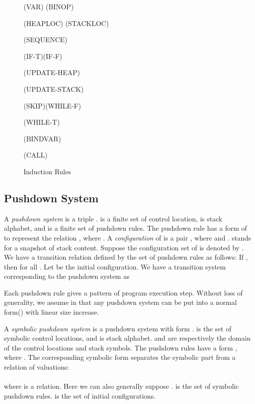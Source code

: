 \documentclass{llncs}
\begin{document}
\begin{figure*}[t]
\begin{minipage}[t]{6.8in}\scriptsize
 \quad(VAR)\qquad
 \quad(BINOP)

\quad (HEAPLOC)\qquad
\quad (STACKLOC)

\quad(SEQUENCE)

\quad(IF-T)\qquad \quad(IF-F)

\quad(UPDATE-HEAP)

\quad(UPDATE-STACK)

\quad
(SKIP)\qquad \quad(WHILE-F)

\quad(WHILE-T)

\quad(BINDVAR)

\quad(CALL)
\end{minipage}
\caption{\label{fig:semantics}Induction Rules}
\end{figure*}

\subsection{\label{subsec:pds}Pushdown System}

\begin{definition}
A \emph{pushdown system} is a triple
.  is a finite set of control
location,  is stack alphabet, and  is a finite set of pushdown
rules. The pushdown rule has a form of  to represent
the relation , where . A \emph{configuration} of  is
a pair , where  and .
 stands for a snapshot of stack content. Suppose the
configuration set of  is denoted by . We have a transition relation  defined by the set of
pushdown rules  as follows: If , then  for all . Let  be the initial configuration. We have a
transition system corresponding to the pushdown system as 
\end{definition}

Each pushdown rule gives a pattern of program execution step.
Without loss of generality, we assume  in that
any pushdown system can be put into a normal form() with linear size increase\cite{mcps:schwoon}.

\begin{definition}
A \emph{symbolic pushdown system} is a pushdown system with form
.  is the set of
symbolic control locations, and  is stack alphabet. 
and  are respectively the domain of the control locations and
stack symbols. The pushdown rules have a form , where
. The
corresponding symbolic form separates the symbolic part from a
relation of valuations:\\
\hspace*{\fill}\hspace*{\fill}\\
where  is a relation.
Here we can also generally suppose .  is the
set of symbolic pushdown rules.  is the set of initial configurations.
\end{definition}
\end{document}
